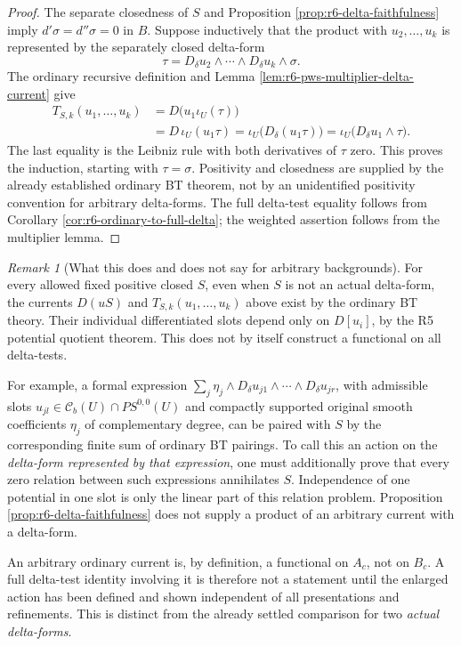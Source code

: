 \documentclass[11pt,a4paper]{article}
\numberwithin{equation}{section}
\theoremstyle{definition}
\theoremstyle{remark}
\newtheorem{remark}[theorem]{Remark}
\begin{document}
\begin{proof}
The separate closedness of $S$ and Proposition
\ref{prop:r6-delta-faithfulness} imply
$d'\sigma=d''\sigma=0$ in $B$.  Suppose inductively that the product
with $u_2,\ldots,u_k$ is represented by the separately closed
delta-form
\[
                 \tau=D_\delta u_2\wedge\cdots\wedge
                                      D_\delta u_k\wedge\sigma.
\]
The ordinary recursive definition and Lemma
\ref{lem:r6-pws-multiplier-delta-current} give
\[
 \begin{split}
 T_{S,k}(u_1,\ldots,u_k)
      &=D\bigl(u_1\iota_U(\tau)\bigr)\\
      &=D\,\iota_U(u_1\tau)
       =\iota_U\bigl(D_\delta(u_1\tau)\bigr)
       =\iota_U\bigl(D_\delta u_1\wedge\tau\bigr).
 \end{split}
\]
The last equality is the Leibniz rule with both derivatives of
$\tau$ zero.  This proves the induction, starting with $\tau=\sigma$.
Positivity and closedness are supplied by the already established
ordinary BT theorem, not by an unidentified positivity convention
for arbitrary delta-forms.  The full delta-test equality follows
from Corollary \ref{cor:r6-ordinary-to-full-delta}; the weighted
assertion follows from the multiplier lemma.
\end{proof}

\begin{remark}[What this does and does not say for arbitrary backgrounds]
\label{rem:r6-arbitrary-background-delta-gate}
For every allowed fixed positive closed $S$, even when $S$ is not an
actual delta-form, the currents
$D(uS)$ and $T_{S,k}(u_1,\ldots,u_k)$ above exist by the ordinary
BT theory.  Their individual differentiated slots depend only on
$D[u_i]$, by the R5 potential quotient theorem.  This does not by
itself construct a functional on all delta-tests.

For example, a formal expression
$\sum_j\eta_j\wedge D_\delta u_{j1}\wedge\cdots\wedge
D_\delta u_{jr}$, with admissible slots
$u_{jl}\in\mathcal C_b(U)\cap PS^{0,0}(U)$ and compactly supported
original smooth coefficients $\eta_j$ of complementary degree,
can be paired with $S$ by the corresponding finite sum of ordinary
BT pairings.  To call this an action on the \emph{delta-form represented
by that expression}, one must additionally prove that every zero
relation between such expressions annihilates $S$.  Independence
of one potential in one slot is only the linear part of this
relation problem.  Proposition \ref{prop:r6-delta-faithfulness}
does not supply a product of an arbitrary current with a delta-form.

An arbitrary ordinary current is, by definition, a functional on
$A_c$, not on $B_c$.  A full delta-test identity involving it is
therefore not a statement until the enlarged action has been
defined and shown independent of all presentations and refinements.
This is distinct from the already settled comparison for two
\emph{actual delta-forms}.
\end{remark}
\end{document}
